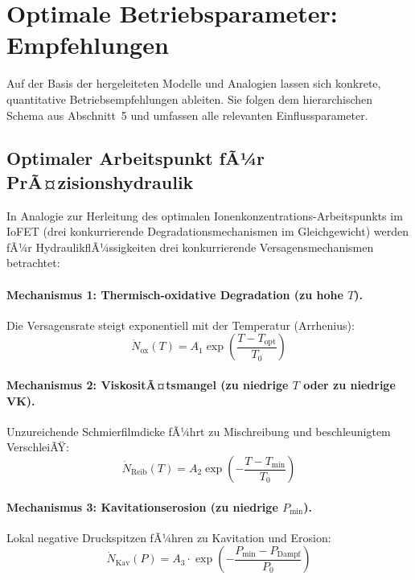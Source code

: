 ﻿\documentclass[a4paper,12pt]{scrreprt}
\theoremstyle{definition}
\begin{document}
\section{Optimale Betriebsparameter: Empfehlungen}

Auf der Basis der hergeleiteten Modelle und Analogien lassen sich
konkrete, quantitative Betriebsempfehlungen ableiten. Sie folgen dem
hierarchischen Schema aus Abschnitt~5 und umfassen alle relevanten
Einflussparameter.

\subsection{Optimaler Arbeitspunkt fÃ¼r PrÃ¤zisionshydraulik}

In Analogie zur Herleitung des optimalen Ionenkonzentrations-Arbeitspunkts
im IoFET (drei konkurrierende Degradationsmechanismen im Gleichgewicht)
werden fÃ¼r HydraulikflÃ¼ssigkeiten drei konkurrierende Versagensmechanismen
betrachtet:

\paragraph{Mechanismus 1: Thermisch-oxidative Degradation (zu hohe $T$).}
Die Versagensrate steigt exponentiell mit der Temperatur (Arrhenius):
\begin{equation}
  \dot{N}_{\mathrm{ox}}(T) = A_1 \exp\!\left(\frac{T - T_{\mathrm{opt}}}{T_0}\right)
  \label{eq:versagen_ox}
\end{equation}

\paragraph{Mechanismus 2: ViskositÃ¤tsmangel (zu niedrige $T$ oder zu niedrige VK).}
Unzureichende Schmierfilmdicke fÃ¼hrt zu Mischreibung und beschleunigtem
VerschleiÃŸ:
\begin{equation}
  \dot{N}_{\mathrm{Reib}}(T) = A_2 \exp\!\left(-\frac{T - T_{\mathrm{min}}}{T_0}\right)
  \label{eq:versagen_reib}
\end{equation}

\paragraph{Mechanismus 3: Kavitationserosion (zu niedrige $P_{\min}$).}
Lokal negative Druckspitzen fÃ¼hren zu Kavitation und Erosion:
\begin{equation}
  \dot{N}_{\mathrm{Kav}}(P) = A_3 \cdot
    \exp\!\left(-\frac{P_{\min} - P_{\mathrm{Dampf}}}{P_0}\right)
  \label{eq:versagen_kav}
\end{equation}
\end{document}
